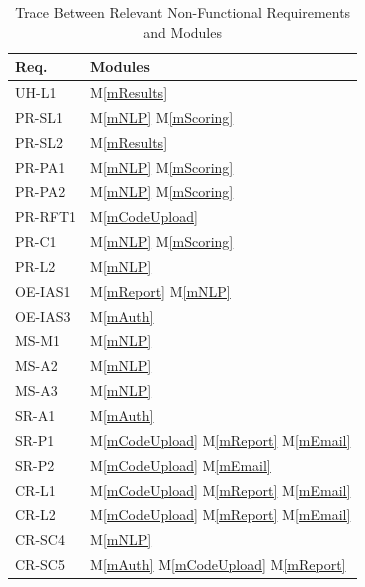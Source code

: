 \documentclass[12pt, titlepage]{article}
\newcommand{\mref}[1]{M\ref{#1}}
\begin{document}
\begin{table}[H]
  \centering
  \begin{tabular}{p{} p{}}
  \toprule
  \textbf{Req.} & \textbf{Modules}\\
  \midrule
  UH-L1 & \mref{mResults} \\
  PR-SL1 & \mref{mNLP} \mref{mScoring} \\
  PR-SL2 & \mref{mResults} \\
  PR-PA1 & \mref{mNLP} \mref{mScoring} \\
  PR-PA2 & \mref{mNLP} \mref{mScoring} \\
  PR-RFT1 & \mref{mCodeUpload} \\
  PR-C1 & \mref{mNLP} \mref{mScoring} \\
  PR-L2 & \mref{mNLP} \\
  OE-IAS1 & \mref{mReport} \mref{mNLP} \\
  OE-IAS3 & \mref{mAuth} \\
  MS-M1 & \mref{mNLP} \\
  MS-A2 & \mref{mNLP} \\
  MS-A3 & \mref{mNLP} \\
  SR-A1 & \mref{mAuth} \\
  SR-P1 & \mref{mCodeUpload} \mref{mReport} \mref{mEmail}\\
  SR-P2 & \mref{mCodeUpload} \mref{mEmail}\\
  CR-L1 & \mref{mCodeUpload} \mref{mReport} \mref{mEmail}\\
  CR-L2 & \mref{mCodeUpload} \mref{mReport} \mref{mEmail}\\
  CR-SC4 & \mref{mNLP} \\
  CR-SC5 & \mref{mAuth} \mref{mCodeUpload} \mref{mReport} \\
  \bottomrule
  \end{tabular}
  \caption{Trace Between Relevant Non-Functional Requirements and Modules}
  \label{TblNFRT}
\end{table}
\end{document}
